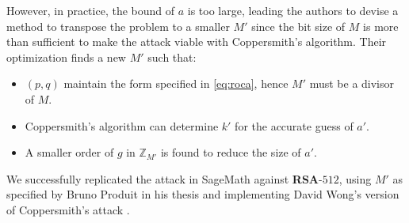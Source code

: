 \documentclass[a4paper,12pt]{report}
\newcommand{\Z}{\mathbb{Z}}
\begin{document}
However, in practice, the bound of $a$ is too large, leading the authors to devise a method to transpose the problem to a smaller $M'$ since the bit size of $M$ is more than sufficient to make the attack viable with Coppersmith's algorithm. Their optimization finds a new $M'$ such that:

\begin{itemize}
    \item $(p, q)$ maintain the form specified in \ref{eq:roca}, hence $M'$ must be a divisor of $M$.
    \item Coppersmith's algorithm can determine $k'$ for the accurate guess of $a'$.
    \item A smaller order of $g$ in $\Z_{M'}$ is found to reduce the size of $a'$.
\end{itemize}

We successfully replicated the attack in SageMath against \textbf{RSA}-$512$, using $M'$ as specified by Bruno Produit \cite{rocaopt} in his thesis and implementing David Wong's version of Coppersmith's attack \cite{wong2015}.
\end{document}
